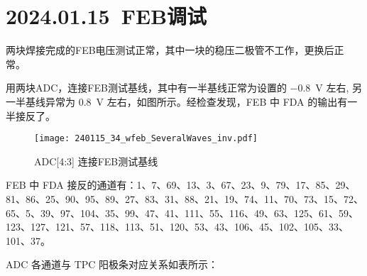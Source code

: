 \section{2024.01.15~FEB调试}
两块焊接完成的FEB电压测试正常，其中一块的稳压二极管不工作，更换后正常。\par
用两块ADC，连接FEB测试基线，其中有一半基线正常为设置的 \SI{-0.8}{V} 左右, 另一半基线异常为 \SI{0.8}{V} 左右，如图所示。经检查发现，FEB 中 FDA 的输出有一半接反了。\par
\begin{figure}[!htbp]
  \centering
  \texttt{[image: 240115\_34\_wfeb\_SeveralWaves\_inv.pdf]}
  \caption{ADC[4:3] 连接FEB测试基线}
  \label{fig:adc34_wfeb}
\end{figure}
FEB 中 FDA 接反的通道有：1、7、69、13、3、67、23、9、79、17、85、29、81、86、25、90、95、89、27、83、31、88、21、19、74、11、70、73、15、72、65、5、39、97、104、35、99、47、41、111、55、116、49、63、125、61、59、123、127、121、57、118、113、51、120、53、43、106、45、102、105、33、101、37。\par
ADC 各通道与 TPC 阳极条对应关系如表所示：
